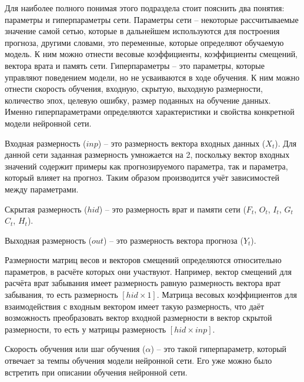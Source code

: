 {\gostFont

  \par \redline Для наиболее полного понимая этого подраздела стоит пояснить два понятия: параметры и гиперпараметры сети. Параметры сети {--} некоторые рассчитываемые значение самой сетью, которые в дальнейшем используются для построения прогноза, другими словами, это переменные, которые определяют обучаемую модель. К ним можно отнести весовые коэффициенты, коэффициенты смещений, вектора врата и память сети. Гиперпараметры {--} это параметры, которые управляют поведением модели, но не усваиваются в ходе обучения. К ним можно отнести скорость обучения, входную, скрытую, выходную размерности, количество эпох, целевую ошибку, размер поданных на обучение данных. Именно гиперпараметрами определяются характеристики и свойства конкретной модели нейронной сети.

  \par \redline Входная размерность ($inp$) {--} это размерность вектора входных данных ($X_t$). Для данной сети заданная размерность умножается на 2, поскольку вектор входных значений содержит примеры как прогнозируемого параметра, так и параметра, который влияет на прогноз. Таким образом производится учёт зависимостей между параметрами.

  \par \redline Скрытая размерность ($hid$) {--} это размерность врат и памяти сети ($F_t$, $O_t$, $I_t$, $G_t$ $C_t$, $H_t$). 

  \par \redline Выходная размерность ($out$) {--} это размерность вектора прогноза ($Y_t$).

  \par \redline Размерности матриц весов и векторов смещений определяются относительно параметров, в расчёте которых они участвуют. Например, вектор смещений для расчёта врат забывания имеет размерность равную размерность вектора врат забывания, то есть размерность $[hid \times 1]$. Матрица весовых коэффициентов для взаимодействия с входным вектором имеет такую размерность, что даёт возможность преобразовать вектор входной размерности в вектор скрытой размерности, то есть у матрицы размерность $[hid \times inp]$.

  \par \redline Скорость обучения или шаг обучения ($\alpha$) {--} это такой гиперпараметр, который отвечает за темпы обучения модели нейронной сети. Его уже можно было встретить при описании обучения нейронной сети.

}
